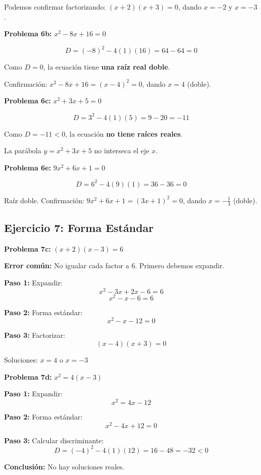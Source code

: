 Podemos confirmar factorizando: $(x+2)(x+3) = 0$, dando $x = -2$ y $x = -3$.

\textbf{Problema 6b:} $x^2 - 8x + 16 = 0$

$$D = (-8)^2 - 4(1)(16) = 64 - 64 = 0$$

Como $D = 0$, la ecuación tiene \textbf{una raíz real doble}.

Confirmación: $x^2 - 8x + 16 = (x-4)^2 = 0$, dando $x = 4$ (doble).

\textbf{Problema 6c:} $x^2 + 3x + 5 = 0$

$$D = 3^2 - 4(1)(5) = 9 - 20 = -11$$

Como $D = -11 < 0$, la ecuación \textbf{no tiene raíces reales}.

La parábola $y = x^2 + 3x + 5$ no interseca el eje $x$.

\textbf{Problema 6e:} $9x^2 + 6x + 1 = 0$

$$D = 6^2 - 4(9)(1) = 36 - 36 = 0$$

Raíz doble. Confirmación: $9x^2 + 6x + 1 = (3x+1)^2 = 0$, dando $x = -\frac{1}{3}$ (doble).


\subsection*{Ejercicio 7: Forma Estándar}

\textbf{Problema 7c:} $(x + 2)(x - 3) = 6$

\textbf{Error común:} No igualar cada factor a 6. Primero debemos expandir.

\textbf{Paso 1:} Expandir:
$$x^2 - 3x + 2x - 6 = 6$$
$$x^2 - x - 6 = 6$$

\textbf{Paso 2:} Forma estándar:
$$x^2 - x - 12 = 0$$

\textbf{Paso 3:} Factorizar:
$$(x - 4)(x + 3) = 0$$

Soluciones: $x = 4$ o $x = -3$

\textbf{Problema 7d:} $x^2 = 4(x - 3)$

\textbf{Paso 1:} Expandir:
$$x^2 = 4x - 12$$

\textbf{Paso 2:} Forma estándar:
$$x^2 - 4x + 12 = 0$$

\textbf{Paso 3:} Calcular discriminante:
$$D = (-4)^2 - 4(1)(12) = 16 - 48 = -32 < 0$$

\textbf{Conclusión:} No hay soluciones reales.


